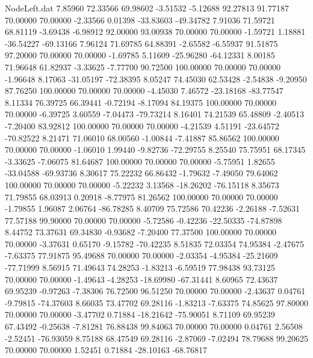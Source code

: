 \begin{filecontents}{NodeLeft.dat}
   7.85960   72.33566   69.98602    -3.51532   -5.12688   92.27813   91.77187   70.00000   70.00000   -2.33566    0.01398  -33.83603  -49.34782
   7.91036   71.59721   68.81119    -3.69438   -6.98912   92.00000   93.00938   70.00000   70.00000   -1.59721    1.18881  -36.54227  -69.13166
   7.96124   71.69785   64.88391    -2.65582   -6.55937   91.51875   97.20000   70.00000   70.00000   -1.69785    5.11609  -25.96280  -64.12331
   8.00185   71.96648   61.82937    -3.33625   -7.77700   90.72500  100.00000   70.00000   70.00000   -1.96648    8.17063  -31.05197  -72.38395
   8.05247   74.45030   62.53428    -2.54838   -9.20950   87.76250  100.00000   70.00000   70.00000   -4.45030    7.46572  -23.18168  -83.77547
   8.11334   76.39725   66.39441    -0.72194   -8.17094   84.19375  100.00000   70.00000   70.00000   -6.39725    3.60559   -7.04473  -79.73214
   8.16401   74.21539   65.48809    -2.40513   -7.20400   83.92812  100.00000   70.00000   70.00000   -4.21539    4.51191  -23.64572  -70.82522
   8.21471   71.06010   68.00560    -1.00844   -7.41887   85.86562  100.00000   70.00000   70.00000   -1.06010    1.99440   -9.82736  -72.29755
   8.25540   75.75951   68.17345    -3.33625   -7.06075   81.64687  100.00000   70.00000   70.00000   -5.75951    1.82655  -33.04588  -69.93736
   8.30617   75.22232   66.86432    -1.79632   -7.49050   79.64062  100.00000   70.00000   70.00000   -5.22232    3.13568  -18.26202  -76.15118
   8.35673   71.79855   68.03913     0.20918   -8.77975   81.26562  100.00000   70.00000   70.00000   -1.79855    1.96087    2.06764  -86.78285
   8.40709   75.72586   70.42236    -2.26188   -7.52631   77.57188   99.90000   70.00000   70.00000   -5.72586   -0.42236  -22.50335  -74.87898
   8.44752   73.37631   69.34830    -0.93682   -7.20400   77.37500  100.00000   70.00000   70.00000   -3.37631    0.65170   -9.15782  -70.42235
   8.51835   72.03354   74.95384    -2.47675   -7.63375   77.91875   95.49688   70.00000   70.00000   -2.03354   -4.95384  -25.21609  -77.71999
   8.56915   71.49643   74.28253    -1.83213   -6.59519   77.98438   93.73125   70.00000   70.00000   -1.49643   -4.28253  -18.69980  -67.31441
   8.60965   72.43637   69.95239    -0.97263   -7.38306   76.72500   96.51250   70.00000   70.00000   -2.43637    0.04761   -9.79815  -74.37603
   8.66035   73.47702   69.28116    -1.83213   -7.63375   74.85625   97.80000   70.00000   70.00000   -3.47702    0.71884  -18.21642  -75.90051
   8.71109   69.95239   67.43492    -0.25638   -7.81281   76.88438   99.84063   70.00000   70.00000    0.04761    2.56508   -2.52451  -76.93059
   8.75188   68.47549   69.28116    -2.87069   -7.02494   78.79688   99.20625   70.00000   70.00000    1.52451    0.71884  -28.10163  -68.76817

\end{filecontents}
